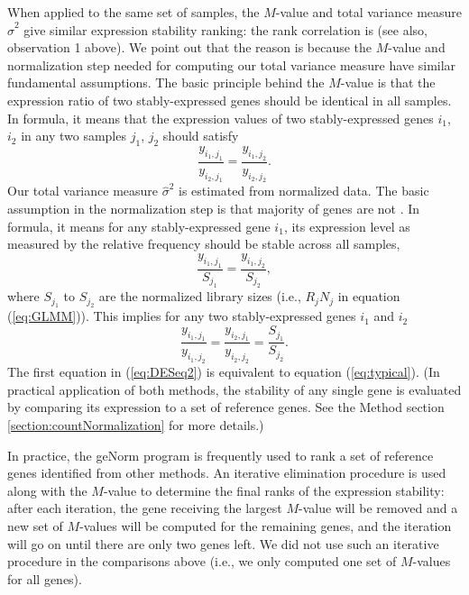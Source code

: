 	When applied to the same set of samples, the $M$-value and total variance
	measure $\hat\sigma^2$ give similar expression stability ranking: the rank
	correlation is \recallrankcorrelation (see also, observation 1 above).
	We point out that the reason is because the $M$-value and normalization step
	needed for computing our total variance measure have similar fundamental
	assumptions. 
	The basic principle
	behind the $M$-value is that the expression ratio of two stably-expressed
	genes should be identical in all samples. In formula, it means that the
	expression values of two stably-expressed genes $i_1$, $i_2$ in any two samples $j_1$, $j_2$
	should satisfy
	\begin{equation}\label{eq:typical}
	\dfrac{y_{i_1, j_1}}{y_{i_2, j_1}} = \dfrac{y_{i_1, j_2}}{y_{i_2, j_2}}.
	\end{equation} 
	Our total variance measure $\hat\sigma^2$ is estimated from normalized data.
	The basic assumption in the normalization step is that majority of genes are
	not \DED. In formula, it means for any stably-expressed gene $i_1$, its expression
	level as measured by the relative frequency should be stable across all
	samples,
	\begin{equation}\label{eq:DESeq} 
	\frac{y_{i_1, j_1}}{S_{j_1}}= \dfrac{y_{i_1, j_2}}{S_{j_2}},
	\end{equation}
	where $S_{j_1}$ to $S_{j_2}$ are the normalized library sizes (i.e., $R_j N_j$ in equation 
	(\ref{eq:GLMM})).
	This implies for any two stably-expressed genes $i_1$ and $i_2$
	\begin{equation}\label{eq:DESeq2} 
	\frac{y_{i_1, j_1}}{y_{i_1, j_2}} = \frac{y_{i_2, j_1}}{y_{i_2, j_2}} =
	\frac{S_{j_1}}{S_{j_2}}.
	\end{equation}
	The first equation in (\ref{eq:DESeq2}) is equivalent to equation
	(\ref{eq:typical}). (In practical application of both methods, the stability
	of any single gene is evaluated by comparing its expression to a set of
	reference genes. See the Method section \ref{section:countNormalization} for more details.)
	
	In practice, the geNorm program \citep{vandesompele2002accurate} is frequently
	used to rank a set of reference genes identified from other methods.  An
	iterative elimination procedure is used along with the $M$-value to determine
	the final ranks of the expression stability:  after each iteration, the gene
	receiving the largest $M$-value will be removed and a new set of $M$-values
	will be computed for the remaining genes, and the iteration will go on until
	there are only two genes left.  We did not use such an iterative procedure in
	the comparisons above (i.e., we only computed one set of $M$-values for all
	genes). 
	
